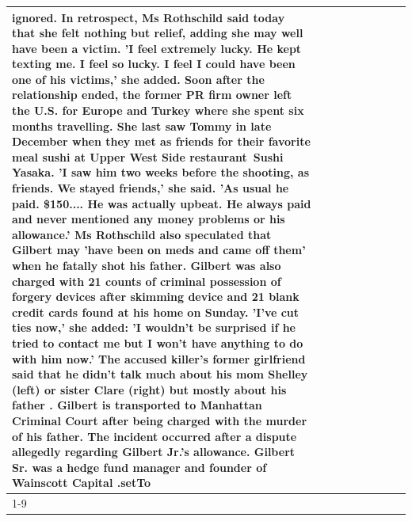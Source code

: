 \begin{table}[H]
\begin{tabular}{lllrlllll}
ignored. In retrospect, Ms Rothschild said today that she felt nothing but relief, adding she may well have been a victim. 'I feel extremely lucky. He kept texting me. I feel so lucky. I feel I could have been one of his victims,' she added. Soon after the relationship ended, the former PR firm owner left the U.S. for Europe and Turkey where she spent six months  travelling. She last saw Tommy in late December when they met as friends for their favorite meal sushi at Upper West Side restaurant Sushi Yasaka. 'I saw him two weeks before the shooting, as friends. We stayed friends,' she said. 'As usual he paid. \$150.... He was actually upbeat. He always paid and never mentioned any money problems or his allowance.' Ms Rothschild also speculated that Gilbert may 'have been on meds and came off them' when he fatally shot his father. Gilbert was also charged with 21 counts of criminal possession of forgery devices after skimming device and 21 blank credit cards found at his home on Sunday. 'I've cut ties now,' she added: 'I wouldn’t be surprised if he tried to contact me but I won’t have anything to do with him now.' The accused killer's former girlfriend said that he didn't talk much about his mom Shelley (left) or sister Clare (right) but mostly about his father . Gilbert is transported to Manhattan Criminal Court  after being charged with the murder of his father. The incident occurred after a dispute allegedly regarding Gilbert Jr.'s allowance. Gilbert Sr. was a hedge fund manager and founder of Wainscott Capital .setTo \\
\cline{1-9}

\end{tabular}
\end{table}
